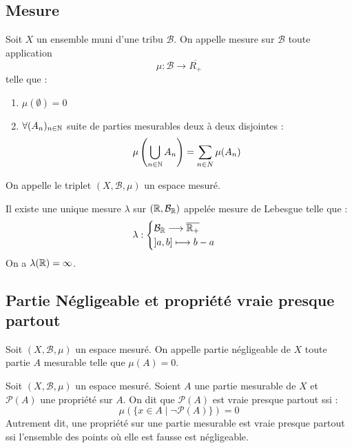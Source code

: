 \newpage 
\subsection{Mesure}

\begin{definition}[Mesure]
    Soit $X$ un ensemble muni d'une tribu $ \mathcal{B}$. On appelle mesure sur $ \mathcal{B}$ toute application 
        \[ \mu : \mathcal{B} \longrightarrow \overline{R_+} \] 
    telle que : 
    \begin{enumerate}[label=\roman*)]
        \item $\mu (\emptyset) = 0 $
        \item $ \forall (A_n)_{n \in \mathbb{N}}$ suite de parties mesurables deux à deux disjointes :
            \[ \mu \left( \bigcup_{n \in \mathbb{N}} A_n \right) = \sum_{n \in N} \mu (A_n) \] 
    \end{enumerate}
    On appelle le triplet $(X, \mathcal{B}, \mu)$ un espace mesuré. 
\end{definition}

\begin{theorem}
    Il existe une unique mesure $\lambda$ sur $(\mathbb{R}, \mathcal{B}_{\mathbb{R}})$ appelée mesure de Lebesgue telle que : 
        \[ \lambda : 
            \begin{cases}
                \mathcal{B}_{\mathbb{R}} \longrightarrow \overline{\mathbb{R}_+} \\ 
                ]a,b] \longmapsto b-a 
            \end{cases}
        \] 
    On a $\lambda(\mathbb{R}) = \infty$. 
\end{theorem}

\subsection{Partie Négligeable et propriété vraie presque partout}

\begin{definition}
    Soit $(X, \mathcal{B},\mu)$ un espace mesuré. On appelle partie négligeable de $X$ toute partie $A$ mesurable telle que 
    $\mu(A) = 0$. 
\end{definition}

\begin{definition}
    Soit $(X, \mathcal{B},\mu)$ un espace mesuré. Soient $A$ une partie mesurable de $X$ et $ \mathcal{P}(A)$ une propriété sur $A$. 
    On dit que $ \mathcal{P}(A)$ est vraie presque partout ssi :
        \[ \mu ( \{ x \in A \; | \; \lnot \mathcal{P}(A) \} ) = 0 \] 
    Autrement dit, une propriété sur une partie mesurable est vraie presque partout ssi l'ensemble des points où elle est fausse 
    est négligeable. 
\end{definition}

